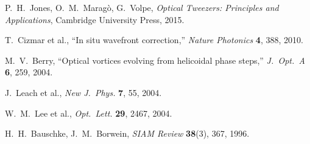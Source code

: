 \documentclass[11pt,a4paper]{article}
\begin{document}
\begin{enumerate}[leftmargin=*, label={[\arabic*]}]
  \item P.~H.~Jones, O.~M.~Maragò, G.~Volpe,
    \textit{Optical Tweezers: Principles and Applications},
    Cambridge University Press, 2015.
  \item T.~Cizmar et al.,
    ``In situ wavefront correction,''
    \textit{Nature Photonics} \textbf{4}, 388, 2010.
  \item M.~V.~Berry,
    ``Optical vortices evolving from helicoidal phase steps,''
    \textit{J.~Opt.~A} \textbf{6}, 259, 2004.
  \item J.~Leach et al., \textit{New J.~Phys.} \textbf{7}, 55, 2004.
  \item W.~M.~Lee et al., \textit{Opt.~Lett.} \textbf{29}, 2467, 2004.
  \item H.~H.~Bauschke, J.~M.~Borwein,
    \textit{SIAM Review} \textbf{38}(3), 367, 1996.
\end{enumerate}
\end{document}
